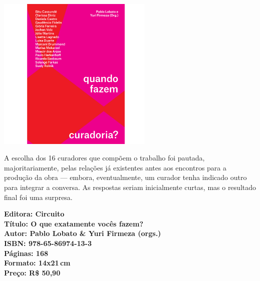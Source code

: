 \begin{center}
\hspace*{.5cm}\includegraphics[width=74mm]{./CAPAS/CIRCUITO_CURADORIA.jpg}
\end{center}
\hspace*{-7cm}\hrulefill\hspace*{-7cm}
\medskip

\noindent{}A escolha dos 16 curadores que compõem o trabalho foi pautada, majoritariamente, pelas relações já existentes antes aos encontros para a produção da obra --- embora, eventualmente, um curador tenha indicado outro para integrar a conversa.  As respostas seriam inicialmente curtas, mas o resultado final foi uma surpresa.

\vfill
\noindent\begin{minipage}[c]{1\linewidth}
{\small\textbf{
\hspace*{-.1cm}Editora: Circuito\\
Título: O que exatamente vocês fazem?\\
Autor: Pablo Lobato \& Yuri Firmeza (orgs.)\\ 
ISBN: 978-65-86974-13-3\\
Páginas: 168\\
Formato: 14x21\,cm\\
Preço: R\$ 50,90\\
}}
\end{minipage}
\pagebreak

\vspace*{1.5cm}
\bigskip

